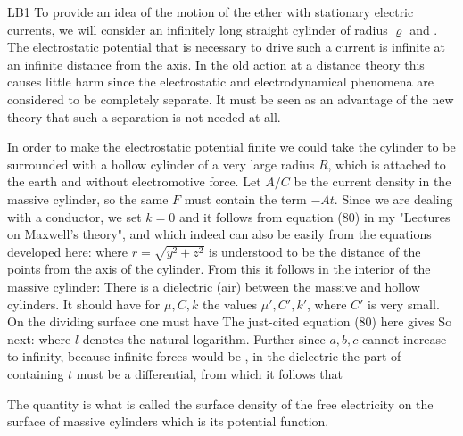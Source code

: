 \begin{paper}{LB1}
To provide an idea of the motion of the ether with stationary electric currents, we will consider an infinitely long straight cylinder of radius $\varrho$ and . The electrostatic potential that is necessary to drive such a current is infinite at an infinite distance from the axis. In the old action at a distance theory this causes little harm since the electrostatic and electrodynamical phenomena are considered to be completely separate. It must be seen as an advantage of the new theory that such a separation is not needed at all.

In order to make the electrostatic potential finite we could take the cylinder to be surrounded with a hollow cylinder of a very large radius $R$, which is attached to the earth and without electromotive force. Let $A/C$ be the current density in the massive cylinder, so the same $F$ must contain the term $-At$. Since we are dealing with a conductor, we set $k=0$ and it follows from equation (80) in my "Lectures on Maxwell's theory", and which indeed can also be easily from the equations developed here:
where $r=\sqrt{y^2+z^2}$ is understood to be the distance of the points from the axis of the cylinder. From this it follows in the interior of the massive cylinder:
There is a dielectric (air) between the massive and hollow cylinders. It should have for $\mu,C,k$ the values $\mu',C',k'$, where $C'$ is very small. On the dividing surface one must have
The just-cited equation (80) here gives
So next:
where $l$ denotes the natural logarithm. Further since $a,b,c$ cannot increase to infinity, because infinite forces would be , in the dielectric the part of
containing $t$ must be a differential, from which it follows that

The quantity
is what is called the surface density of the free electricity on the surface of massive cylinders
which is its potential function.


\end{paper}

